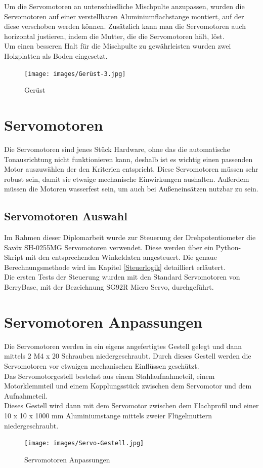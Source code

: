 \newpage
Um die Servomotoren an unterschiedliche Mischpulte anzupassen, wurden die Servomotoren auf einer verstellbaren Aluminiumflachstange montiert, auf der diese verschoben werden können. Zusätzlich kann man die Servomotoren auch horizontal justieren, indem die Mutter, die die Servomotoren hält, löst. \\
Um einen besseren Halt für die Mischpulte zu gewährleisten wurden zwei Holzplatten als Boden eingesetzt.

\begin{figure}[H]
	\centering
	\texttt{[image: images/Gerüst-3.jpg]}
	\caption[Gerüst]{Gerüst}
	\label{fig:Gerüst-2}
\end{figure}


\section{Servomotoren}
Die Servomotoren sind jenes Stück Hardware, ohne das die automatische Tonausrichtung nicht funktionieren kann, deshalb ist es wichtig einen passenden Motor auszuwählen der den Kriterien entspricht. Diese Servomotoren müssen sehr robust sein, damit sie etwaige mechanische Einwirkungen aushalten. Außerdem müssen die Motoren wasserfest sein, um auch bei Außeneinsätzen nutzbar zu sein. 

\newpage
\subsection{Servomotoren Auswahl}

Im Rahmen dieser Diplomarbeit wurde zur Steuerung der Drehpotentiometer die Savöx SH-0255MG Servomotoren verwendet. Diese werden über ein Python-Skript mit den entsprechenden Winkeldaten angesteuert. Die genaue Berechnungsmethode wird im Kapitel \ref{Steuerlogik} detailliert erläutert.\\
Die ersten Tests der Steuerung wurden mit den Standard Servomotoren von BerryBase, mit der Bezeichnung SG92R Micro Servo, durchgeführt.

\section{Servomotoren Anpassungen}
Die Servomotoren werden in ein eigens angefertigtes Gestell gelegt und dann mittels 2 M4 x 20 Schrauben niedergeschraubt. Durch dieses Gestell werden die Servomotoren vor etwaigen mechanischen Einflüssen geschützt. \\
Das Servomotorgestell bestehst aus einem Stahlaufnahmeteil, einem Motorklemmteil und einem Kopplungsstück zwischen dem Servomotor und dem Aufnahmeteil.\\
Dieses Gestell wird dann mit dem Servomotor zwischen dem Flachprofil und einer 10 x 10 x 1000 mm Aluminiumstange mittels zweier Flügelmuttern niedergeschraubt.\\
\begin{figure}[H]
	\centering
	\texttt{[image: images/Servo-Gestell.jpg]}
	\caption[Servomotoren Anpassungen]{Servomotoren Anpassungen}
	\label{fig:Servomotoren Gestell}
\end{figure}

